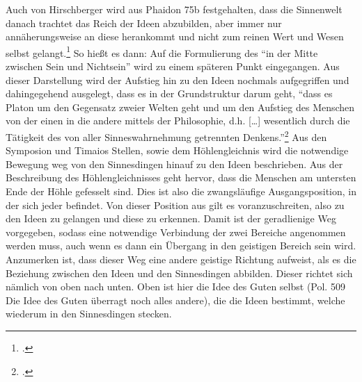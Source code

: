 Auch von Hirschberger wird aus Phaidon 75b festgehalten, dass die Sinnenwelt danach trachtet das Reich der Ideen abzubilden, aber immer nur annäherungsweise an diese herankommt und nicht zum reinen Wert und Wesen selbst gelangt.\footcite[vgl.][S. 100]{Hirschberger} So hießt es dann:
Auf die Formulierung des \enquote{in der Mitte zwischen Sein und Nichtsein} wird zu einem späteren Punkt eingegangen.
Aus dieser Darstellung wird der Aufstieg hin zu den Ideen nochmals aufgegriffen und dahingegehend ausgelegt, dass es in der Grundstruktur darum geht, \enquote{dass es Platon um den Gegensatz zweier Welten geht und um den Aufstieg des Menschen von der einen in die andere mittels der Philosophie, d.h. [\dots] wesentlich durch die Tätigkeit des von aller Sinneswahrnehmung getrennten Denkens.}\footcite[vgl.][S. 29]{DisseMetaphysik}
Aus den Symposion und Timaios Stellen, sowie dem Höhlengleichnis wird die notwendige Bewegung weg von den Sinnesdingen hinauf zu den Ideen beschrieben. Aus der Beschreibung des Höhlengleichnisses geht hervor, dass die Menschen am untersten Ende der Höhle gefesselt sind. Dies ist also die zwangsläufige Ausgangsposition, in der sich jeder befindet. Von dieser Position aus gilt es voranzuschreiten, also zu den Ideen zu gelangen und diese zu erkennen. Damit ist der geradlienige Weg vorgegeben, sodass eine notwendige Verbindung der zwei Bereiche angenommen werden muss, auch wenn es dann ein Übergang in den geistigen Bereich sein wird. 
Anzumerken ist, dass dieser Weg eine andere geistige Richtung aufweist, als es die Beziehung zwischen den Ideen und den Sinnesdingen abbilden.
Dieser richtet sich nämlich von oben nach unten. Oben ist hier die Idee des Guten selbst (Pol. 509 Die Idee des Guten überragt noch alles andere), die die Ideen bestimmt, welche wiederum in den Sinnesdingen stecken.

